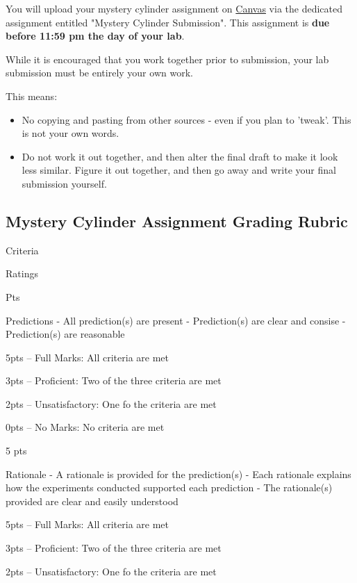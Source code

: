 \documentclass[
]{book}
\providecommand{\tightlist}{%
  \setlength{\itemsep}{0pt}\setlength{\parskip}{0pt}}
\begin{document}
You will upload your mystery cylinder assignment on \href{https://canvas.ubc.ca}{Canvas} via the dedicated assignment entitled "Mystery Cylinder Submission". This assignment is \textbf{due before 11:59 pm the day of your lab}.

While it is encouraged that you work together prior to submission, your lab submission must be entirely your own work.

This means:

\begin{itemize}
\tightlist
\item
  No copying and pasting from other sources - even if you plan to 'tweak'. This is not your own words.
\item
  Do not work it out together, and then alter the final draft to make it look less similar. Figure it out together, and then go away and write your final submission yourself.
\end{itemize}

\hypertarget{mystery-cylinder-assignment-grading-rubric}{%
\subsection*{Mystery Cylinder Assignment Grading Rubric}\label{mystery-cylinder-assignment-grading-rubric}}

Criteria

Ratings

Pts

Predictions
- All prediction(s) are present
- Prediction(s) are clear and consise
- Prediction(s) are reasonable

5pts -- Full Marks: All criteria are met

3pts -- Proficient: Two of the three criteria are met

2pts -- Unsatisfactory: One fo the criteria are met

0pts -- No Marks: No criteria are met

5 pts

Rationale
- A rationale is provided for the prediction(s)
- Each rationale explains how the experiments conducted supported each prediction
- The rationale(s) provided are clear and easily understood

5pts -- Full Marks: All criteria are met

3pts -- Proficient: Two of the three criteria are met

2pts -- Unsatisfactory: One fo the criteria are met
\end{document}

